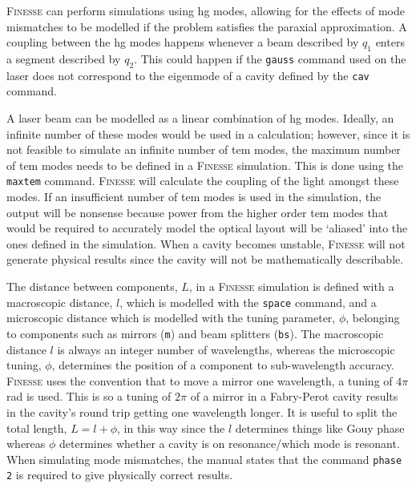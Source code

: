 \par
\textsc{Finesse} can perform simulations using \gls{hg} modes, allowing for the effects of mode mismatches to be modelled if the problem satisfies the paraxial approximation. A coupling between the \gls{hg} modes happens whenever a beam described by $q_1$ enters a segment described by $q_2$. This could happen if the \texttt{gauss} command used on the laser does not correspond to the eigenmode of a cavity defined by the \texttt{cav} command. 
\par
A laser beam can be modelled as a linear combination of \gls{hg} modes. Ideally, an infinite number of these modes would be used in a calculation; however, since it is not feasible to simulate an infinite number of \gls{tem} modes, the maximum number of \gls{tem} modes needs to be defined in a \textsc{Finesse} simulation. This is done using the \texttt{maxtem} command. \textsc{Finesse} will calculate the coupling of the light amongst these modes. If an insufficient number of \gls{tem} modes is used in the simulation, the output will be nonsense because power from the higher order \gls{tem} modes that would be required to accurately model the optical layout will be `aliased' into the ones defined in the simulation. When a cavity becomes unstable, \textsc{Finesse} will not generate physical results since the cavity will not be mathematically describable.
\par
The distance between components, $L$, in a \textsc{Finesse} simulation is defined with a macroscopic distance, $l$, which is modelled with the \texttt{space} command, and a microscopic distance which is modelled with the tuning parameter, $\phi$, belonging to components such as mirrors (\texttt{m}) and beam splitters (\texttt{bs}). The macroscopic distance $l$ is always an integer number of wavelengths, whereas the microscopic tuning, $\phi$, determines the position of a component to sub-wavelength accuracy. \textsc{Finesse} uses the convention that to move a mirror one wavelength, a tuning of $4\pi$\,rad is used. This is so a tuning of $2\pi$ of a mirror in a Fabry-Perot cavity results in the cavity's round trip getting one wavelength longer. It is useful to split the total length, $L = l+\phi$, in this way since the $l$ determines things like Gouy phase whereas $\phi$ determines whether a cavity is on resonance/which mode is resonant. When simulating mode mismatches, the manual states that the command \texttt{phase 2} is required to give physically correct results.
